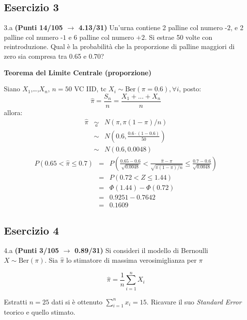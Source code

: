 \documentclass[
  11pt,
]{book}
\theoremstyle{mytheoremstyle}
\theoremstyle{mydefstyle}
\newenvironment{sol}
  {
  \begin{tcolorbox}[enhanced,breakable,arc=0.1mm,boxrule=1pt,colback=white,colframe=iblue,
  title=\bf \fontfamily{lmss}\selectfont \hspace{.5 cm} Soluzione,drop fuzzy shadow]

}{
\end{tcolorbox}
  }
\begin{document}
\subsection{Esercizio 3}\label{esercizio-3-41}

3.a \textbf{(Punti 14/105 \(\rightarrow\) 4.13/31)} Un'urna contiene 2 palline col numero \(\mbox{-2}\), e 2 palline col numero \(\mbox{-1}\) e 6 palline col numero \(\mbox{+2}\).
Si estrae 50 volte con reintroduzione.
Qual è la probabilità che la proporzione di palline maggiori di zero sia compresa tra 0.65 e 0.70?

\begin{sol}
\textbf{Teorema del Limite Centrale (proporzione)}

Siano \(X_1\),\ldots,\(X_n\), \(n=50\) VC IID, tc \(X_i\sim\text{Ber}(\pi=0.6)\)\(,\forall i\), posto:
\[
      \hat\pi=\frac{S_n}n = \frac{X_1 + ... + X_n}n
      \]
allora:\begin{eqnarray*}
  \hat\pi & \mathop{\sim}\limits_{a}& N(\pi,\pi(1-\pi)/n) \\
  &\sim & N\left(0.6,\frac{0.6\cdot(1-0.6)}{50}\right) \\
     &\sim & N(0.6,0.0048) 
  \end{eqnarray*}\begin{eqnarray*}
   P( 0.65 < \hat\pi \leq  0.7 ) &=& P\left( \frac { 0.65  -  0.6 }{\sqrt{ 0.0048 }} < \frac { \hat\pi  -  \pi }{ \sqrt{\pi(1-\pi)/n} } \leq \frac { 0.7  -  0.6 }{\sqrt{ 0.0048 }}\right)  \\
              &=& P\left(  0.72  < Z \leq  1.44 \right) \\
              &=& \Phi( 1.44 )-\Phi( 0.72 )\\
              &=&  0.9251 - 0.7642 \\ 
              &=&  0.1609 
   \end{eqnarray*}

\end{sol}

\subsection{Esercizio 4}\label{esercizio-4-41}

4.a \textbf{(Punti 3/105 \(\rightarrow\) 0.89/31)} Si consideri il modello di Bernoulli \(X\sim\text{Ber}(\pi)\). Sia \(\hat\pi\) lo stimatore di massima verosimiglianza per \(\pi\)

\[
  \hat\pi = \frac 1n \sum_{i=1}^n X_i
\]

Estratti \(n=25\) dati si è ottenuto \(\sum_{i=1}^n x_i = 15\). Ricavare il suo \emph{Standard Error} teorico e quello stimato.
\end{document}
